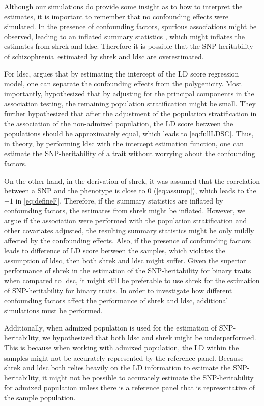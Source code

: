 \documentclass[12pt]{scrbook}
\newcommand*{\scz}{schizophrenia}
\begin{document}
Although our simulations do provide some insight as to how to interpret the estimates, it is important to remember that no confounding effects were simulated.
In the presence of confounding factors, spurious associations might be observed, leading to an inflated summary statistics \citep{Zheng2006}, which might inflates the estimates from \gls{shrek} and \gls{ldsc}. 
Therefore it is possible that the \gls{SNP}-heritability of \scz\ estimated by \gls{shrek} and \gls{ldsc} are overestimated. 

For \gls{ldsc}, \citet{Bulik-Sullivan2015} argues that by estimating the intercept of the \gls{LD} score regression model, one can separate the confounding effects from the polygenicity.
Most importantly, \citet{Bulik-Sullivan2015} hypothesized that by adjusting for the principal components in the association testing, the remaining population stratification might be small.
They further hypothesized that after the adjustment of the population stratification in the association of the non-admixed population, the \gls{LD} score between the populations should be approximately equal, which leads to \cref{eq:fullLDSC}.
Thus, in theory, by performing \gls{ldsc} with the intercept estimation function, one can estimate the \gls{SNP}-heritability of a trait without worrying about the confounding factors.

On the other hand, in the derivation of \gls{shrek}, it was assumed that the correlation between a \gls{SNP} and the phenotype is close to 0 (\cref{eq:assump}), which leads to the $-1$ in \cref{eq:defineF}.
Therefore, if the summary statistics are inflated by confounding factors, the estimates from \gls{shrek} might be inflated.
However, we argue if the association were performed with the population stratification and other covariates adjusted, the resulting summary statistics might be only mildly affected by the confounding effects. 
Also, if the presence of confounding factors leads to difference of \gls{LD} score between the samples, which violates the assumption of \gls{ldsc}, then both \gls{shrek} and \gls{ldsc} might suffer. 
Given the superior performance of \gls{shrek} in the estimation of the \gls{SNP}-heritability for binary traits when compared to \gls{ldsc}, it might still be preferable to use \gls{shrek} for the estimation of \gls{SNP}-heritability for binary traits.
In order to investigate how different confounding factors affect the performance of \gls{shrek} and \gls{ldsc}, additional simulations must be performed.
 
Additionally, when admixed population is used for the estimation of \gls{SNP}-heritability, we hypothesized that both \gls{ldsc} and \gls{shrek} might be underperformed. 
This is because when working with admixed population, the \gls{LD} within the samples might not be accurately represented by the reference panel. 
Because \gls{shrek} and \gls{ldsc} both relies heavily on the \gls{LD} information to estimate the \gls{SNP}-heritability, it might not be possible to accurately estimate the \gls{SNP}-heritability for admixed population unless there is a reference panel that is representative of the sample population.
\end{document}
